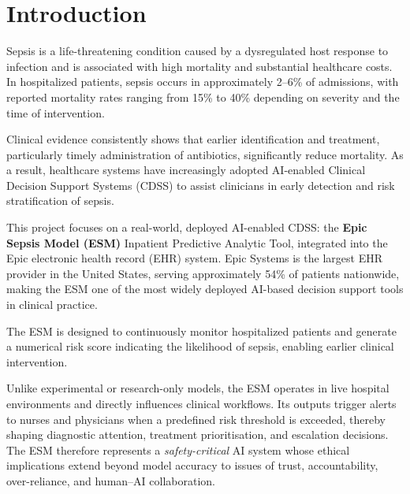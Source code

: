 \documentclass[]{UCD_CS_41820_Report}
\begin{document}
\maketitle
\tableofcontents

\chapter{Introduction}

Sepsis is a life-threatening condition caused by a dysregulated host response to
infection and is associated with high mortality and substantial healthcare costs.
In hospitalized patients, sepsis occurs in approximately 2--6\% of admissions, with
reported mortality rates ranging from 15\% to 40\% depending on severity and the
time of intervention.

Clinical evidence consistently shows that earlier identification and treatment, particularly
timely administration of antibiotics, significantly reduce mortality. As a result,
healthcare systems have increasingly adopted AI-enabled Clinical Decision Support
Systems (CDSS) to assist clinicians in early detection and risk stratification of sepsis.

This project focuses on a real-world, deployed AI-enabled CDSS: the \textbf{Epic Sepsis
Model (ESM)} Inpatient Predictive Analytic Tool, integrated into the Epic electronic
health record (EHR) system. Epic Systems is the largest EHR provider in the United
States, serving approximately 54\% of patients nationwide, making the ESM one of the
most widely deployed AI-based decision support tools in clinical practice.

The ESM is designed to continuously monitor hospitalized patients and generate a
numerical risk score indicating the likelihood of sepsis, enabling earlier clinical
intervention.

Unlike experimental or research-only models, the ESM operates in live hospital
environments and directly influences clinical workflows. Its outputs trigger alerts
to nurses and physicians when a predefined risk threshold is exceeded, thereby
shaping diagnostic attention, treatment prioritisation, and escalation decisions.
The ESM therefore represents a \emph{safety-critical} AI system whose ethical
implications extend beyond model accuracy to issues of trust, accountability,
over-reliance, and human--AI collaboration.
\vspace{-8pt}
\end{document}
